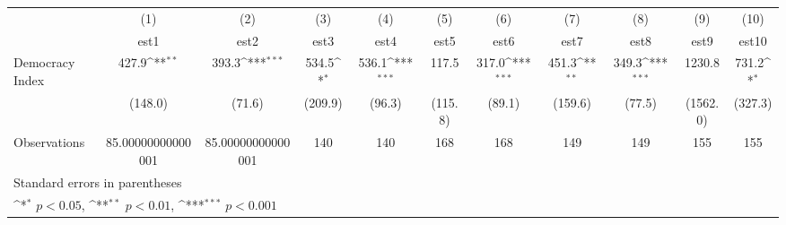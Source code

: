 {
\def\sym#1{\ifmmode^{#1}\else\(^{#1}\)\fi}
\begin{tabular}{l*{10}{c}}
\hline\hline
                    &\multicolumn{1}{c}{(1)}         &\multicolumn{1}{c}{(2)}         &\multicolumn{1}{c}{(3)}         &\multicolumn{1}{c}{(4)}         &\multicolumn{1}{c}{(5)}         &\multicolumn{1}{c}{(6)}         &\multicolumn{1}{c}{(7)}         &\multicolumn{1}{c}{(8)}         &\multicolumn{1}{c}{(9)}         &\multicolumn{1}{c}{(10)}         \\
                    &        est1         &        est2         &        est3         &        est4         &        est5         &        est6         &        est7         &        est8         &        est9         &       est10         \\
\hline
Democracy Index     &       427.9\sym{**} &       393.3\sym{***}&       534.5\sym{*}  &       536.1\sym{***}&       117.5         &       317.0\sym{***}&       451.3\sym{**} &       349.3\sym{***}&      1230.8         &       731.2\sym{*}  \\
                    &     (148.0)         &      (71.6)         &     (209.9)         &      (96.3)         &     (115.8)         &      (89.1)         &     (159.6)         &      (77.5)         &    (1562.0)         &     (327.3)         \\
\hline
Observations        &85.00000000000001         &85.00000000000001         &         140         &         140         &         168         &         168         &         149         &         149         &         155         &         155         \\
\hline\hline
\multicolumn{11}{l}{\footnotesize Standard errors in parentheses}\\
\multicolumn{11}{l}{\footnotesize \sym{*} \(p<0.05\), \sym{**} \(p<0.01\), \sym{***} \(p<0.001\)}\\
\end{tabular}
}
